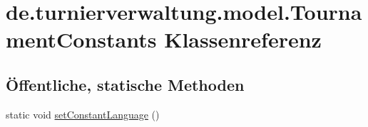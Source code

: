 \hypertarget{classde_1_1turnierverwaltung_1_1model_1_1_tournament_constants}{}\section{de.\+turnierverwaltung.\+model.\+Tournament\+Constants Klassenreferenz}
\label{classde_1_1turnierverwaltung_1_1model_1_1_tournament_constants}
\subsection*{Öffentliche, statische Methoden}
\begin{DoxyCompactItemize}
\item 
static void \hyperlink{classde_1_1turnierverwaltung_1_1model_1_1_tournament_constants_abaf068827f7bae0e6c8b470424f22187}{set\+Constant\+Language} ()
\end{DoxyCompactItemize}
